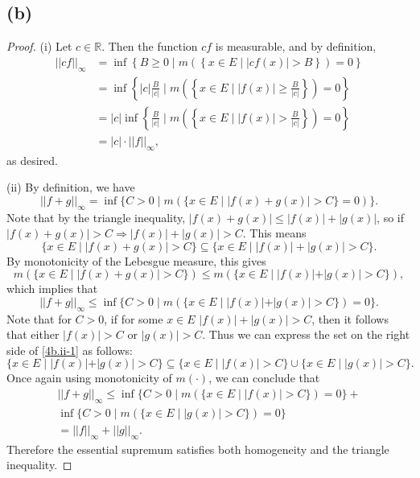 \documentclass{article}
\newcommand{\R}{\mathbb{R}} %
\begin{document}
\subsection*{(b)}
\begin{proof}
	(i) Let $c \in \R$. Then the function $cf$ is measurable, and by definition,
	\begin{align}
		||cf||_{\infty} &= \inf \left\{B \geq 0 \;\big|\; m\left(\left\{x \in E \;|\; |cf(x)| > B\right\}\right) = 0\right\} \\
		&= \inf\left\{|c|\frac{B}{|c|} \;\Big|\; m\left(\left\{x \in E \;|\; |f(x)| \geq \frac{B}{|c|}\right\}\right) = 0\right\} \\
		&= |c| \inf\left\{\frac{B}{|c|} \;\Big|\; m\left(\left\{x \in E \;|\; |f(x)| > \frac{B}{|c|}\right\}\right) = 0\right\} \\
		&= |c| \cdot ||f||_{\infty}, 
	\end{align}
	as desired.
	
	(ii) By definition, we have
	\begin{equation}
		||f + g||_{\infty} = \inf\{C > 0 \;|\; m(\{x \in E \;|\; |f(x) + g(x)| > C\} = 0)\}.
	\end{equation}
	Note that by the triangle inequality, $|f(x) + g(x)| \leq |f(x)| + |g(x)|$, so if \\$|f(x) + g(x)| > C \Rightarrow |f(x)| + |g(x)| > C$. This means
	\begin{equation}\label{4b.ii-1}
		\{x \in E \;|\; |f(x) + g(x)| > C \} \subseteq \{x \in E \;|\; |f(x)| + |g(x)| > C\}.
	\end{equation}
	By monotonicity of the Lebesgue measure, this gives
	\begin{equation}
		m(\{x \in E \;|\; |f(x) + g(x)| > C \}) \leq m(\{x \in E \;|\; |f(x)| + |g(x)| > C\}),
	\end{equation}
	which implies that
	\begin{equation}
		||f + g||_{\infty} \leq \inf\{C > 0 \;|\; m(\{x \in E \;|\; |f(x)| + |g(x)| > C\}) = 0\}.
	\end{equation}
	Note that for $C > 0$, if for some $x \in E$ $|f(x)| + |g(x)| > C$, then it follows that either $|f(x)| > C$ or $|g(x)| > C$. Thus we can express the set on the right side of \eqref{4b.ii-1} as follows:
	\begin{equation}
		\{x \in E \;|\; |f(x)| + |g(x)| > C\} \subseteq \{x \in E \;|\; |f(x)| > C\} \cup \{x \in E \;|\; |g(x)| > C\}.
	\end{equation}
	Once again using monotonicity of $m(\cdot)$, we can conclude that
	\begin{align}
		||f + g||_{\infty} \leq \inf\{C > 0 \;|\; m(\{x \in E \;|\; |f(x)| > C\})=0\} + \nonumber \\ \inf\{C > 0 \;|\; m(\{x \in E \;|\; |g(x)| > C\})=0\} \\
		= ||f||_{\infty} + ||g||_{\infty}.
	\end{align}
	Therefore the essential supremum satisfies both homogeneity and the triangle inequality.
\end{proof}
\end{document}
